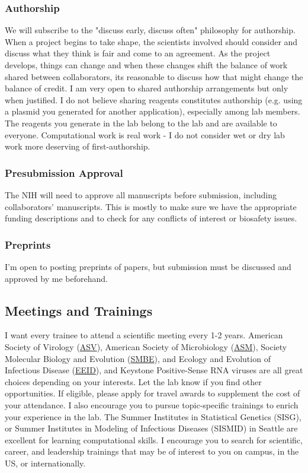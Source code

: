 \documentclass[10pt, letterpaper, twocolumn]{article} %
\begin{document}
\subsubsection{Authorship}
We will subscribe to the "discuss early, discuss often" philosophy for authorship. When a project begins to take shape, the scientists involved should consider and discuss what they think is fair and come to an agreement. As the project develops, things can change and when these changes shift the balance of work shared between collaborators, its reasonable to discuss how that might change the balance of credit. I am very open to shared authorship arrangements but only when justified. I do not believe sharing reagents constitutes authorship (e.g. using a plasmid you generated for another application), especially among lab members. The reagents you generate in the lab belong to the lab and are available to everyone. Computational work is real work - I do not consider wet or dry lab work more deserving of first-authorship.

\subsubsection{Presubmission Approval}
The NIH will need to approve all manuscripts before submission, including collaborators' manuscripts. This is mostly to make sure we have the appropriate funding descriptions and to check for any conflicts of interest or biosafety issues.

\subsubsection{Preprints}
I'm open to posting preprints of papers, but submission must be discussed and approved by me beforehand.

\subsection{Meetings and Trainings}
I want every trainee to attend a scientific meeting every 1-2 years. American Society of Virology (\href{https://asv.org/}{ASV}), American Society of Microbiology (\href{https://asm.org/}{ASM}), Society Molecular Biology and Evolution (\href{https://smbe.org/smbe/}{SMBE}), and Ecology and Evolution of Infectious Disease (\href{https://www.eeidconference2021.org/}{EEID}), and Keystone Positive-Sense RNA viruses are all great choices depending on your interests. Let the lab know if you find other opportunities. If eligible, please apply for travel awards to supplement the cost of your attendance.\newline
I also encourage you to pursue topic-specific trainings to enrich your experience in the lab. The Summer Institutes in Statistical Genetics (SISG), or Summer Institutes in Modeling of Infectious Diseases (SISMID) in Seattle are excellent for learning computational skills. I encourage you to search for scientific, career, and leadership trainings that may be of interest to you on campus, in the US, or internationally.
\end{document}
